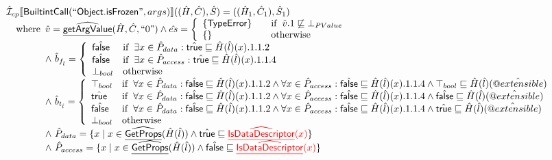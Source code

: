 \[\begin{array}{l}
\aI _{cp}\lbr \SF{BuiltintCall}(``\SF{Object.isFrozen}",args)\rbr((\hat{H},\hat{C}), \hat{S})
  = ((\hat{H}_1, \hat{C}_1), \hat{S}_1)\\
\quad\wherec{
 \hat{v} =\ahf{getArgValue}(\hat{H}, \hat{C}, ``0")
  \land \hat{es} =
    \left\{
    \begin{array}{l@{\quad\quad}l}
      \{ \SF{TypeError} \} & \ifc{\hat{v}.1 \not\sqsubseteq \bot_{PValue}}\\
      \{ \}& \owc\\
    \end{array}
    \right.\\
  \land\ \hat{b}_{f_{\hat{l}}} =\left\{\begin{array}{ll}
    \afalse
    & \ifc{ \exists x \in \hat{P}_{data}: \atrue \sqsubseteq \hat{H}(\hat{l})(x).1.1.2}\\
    \afalse
    & \ifc{ \exists x \in \hat{P}_{access}: \atrue \sqsubseteq \hat{H}(\hat{l})(x).1.1.4}\\
    \bot_{bool} & \owc
    \end{array}\right.\\
  \land\ \hat{b}_{t_{\hat{l}}} =\left\{\begin{array}{ll}
    \top_{bool}
    & \ifc{\forall x \in \hat{P}_{data}: \afalse \sqsubseteq \hat{H}(\hat{l})(x).1.1.2 
      \land \forall x \in \hat{P}_{access}: \afalse \sqsubseteq \hat{H}(\hat{l})(x).1.1.4 
      \land \top_{bool} \sqsubseteq \hat{H}(\hat{l})(\avarprop{extensible})}\\
    \atrue
    & \ifc{\forall x \in \hat{P}_{data}: \afalse \sqsubseteq \hat{H}(\hat{l})(x).1.1.2 
      \land \forall x \in \hat{P}_{access}: \afalse \sqsubseteq \hat{H}(\hat{l})(x).1.1.4 
      \land \afalse \sqsubseteq \hat{H}(\hat{l})(\avarprop{extensible})}\\
    \afalse
    & \ifc{\forall x \in \hat{P}_{data}: \afalse \sqsubseteq \hat{H}(\hat{l})(x).1.1.2 
      \land \forall x \in \hat{P}_{access}: \afalse \sqsubseteq \hat{H}(\hat{l})(x).1.1.4 
      \land \atrue \sqsubseteq \hat{H}(\hat{l})(\avarprop{extensible})}\\
    \bot_{bool} & \owc
    \end{array}\right.\\
  \land\ \hat{P}_{data} =
    \{ x \mid x \in \ahf{GetProps}(\hat{H}(\hat{l}))
    \land \atrue \sqsubseteq {\inred \ahf{IsDataDescriptor}(x)}\}\\
  \land\ \hat{P}_{access} =
    \{ x \mid x \in \ahf{GetProps}(\hat{H}(\hat{l}))
    \land \afalse \sqsubseteq {\inred \ahf{IsDataDescriptor}(x)}\}\\  
}
\end{array}\]
